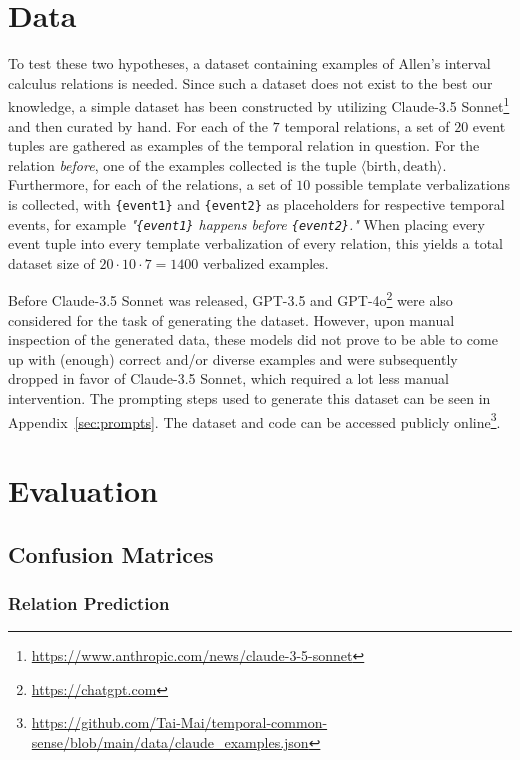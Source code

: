 \documentclass[11pt]{article}
\begin{document}
\section{Data}
\label{sec:data}
To test these two hypotheses, a dataset containing examples of Allen's interval calculus relations is needed. Since such a dataset does not exist to the best our knowledge, a simple dataset has been constructed by utilizing Claude-3.5 Sonnet\footnote{\url{https://www.anthropic.com/news/claude-3-5-sonnet}} and then curated by hand. For each of the $7$ temporal relations, a set of $20$ event tuples are gathered as examples of the temporal relation in question. For the relation \textit{before}, one of the examples collected is the tuple $\langle \text{birth}, \text{death}\rangle$.
Furthermore, for each of the relations, a set of $10$ possible template verbalizations is collected, with \texttt{\{event1\}} and \texttt{\{event2\}} as placeholders for respective temporal events, for example \textit{"\texttt{\{event1\}} happens before \texttt{\{event2\}}."}
When placing every event tuple into every template verbalization of every relation, this yields a total dataset size of $20 \cdot 10 \cdot 7 = 1400$ verbalized examples.

Before Claude-3.5 Sonnet was released, GPT-3.5 and GPT-4o\footnote{\url{https://chatgpt.com}} were also considered for the task of generating the dataset. However, upon manual inspection of the generated data, these models did not prove to be able to come up with (enough) correct and/or diverse examples and were subsequently dropped in favor of Claude-3.5 Sonnet, which required a lot less manual intervention. The prompting steps used to generate this dataset can be seen in Appendix~\ref{sec:prompts}. The dataset and code can be accessed publicly online\footnote{\url{https://github.com/Tai-Mai/temporal-common-sense/blob/main/data/claude_examples.json}}.

\section{Evaluation} %
\label{sec:Evaluation}

\subsection{Confusion Matrices}

\subsubsection{Relation Prediction}
\end{document}
